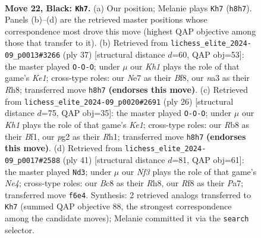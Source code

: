 \documentclass[11pt]{article}
\begin{document}
\clearpage

\begin{figure}[p]\centering
\begin{subfigure}{0.46\textwidth}\centering
\resizebox{\linewidth}{!}{%
\newchessgame
\chessboard[
  setfen={1rb2r1k/p3np2/1p2pnpp/2P5/1RP5/N3PB1P/P4PP1/2B1R1K1 b - - 3 22},
  showmover=false,
  pgfstyle=straightmove, color=movearrow, markmove={h8-h7}
]}
\caption{}
\end{subfigure}\hfill
\begin{subfigure}{0.46\textwidth}\centering
\resizebox{\linewidth}{!}{%
\newchessgame
\chessboard[
  setfen={r3kb1r/1p4p1/p1p1np2/4P2p/2N1P2P/1PP2P2/1P1B1P2/R3K2R b KQkq - 0 19},
  showmover=false,
  pgfstyle=straightmove, color=movearrow, markmove={e8-c8}
]}
\caption{}
\end{subfigure}
\\[4pt]
\begin{subfigure}{0.46\textwidth}\centering
\resizebox{\linewidth}{!}{%
\newchessgame
\chessboard[
  setfen={r3kb1r/ppp2ppp/5p2/3b4/7N/1PP1P3/P4PPP/R3KB1R w KQkq - 0 14},
  showmover=false,
  pgfstyle=straightmove, color=movearrow, markmove={e1-c1}
]}
\caption{}
\end{subfigure}\hfill
\begin{subfigure}{0.46\textwidth}\centering
\resizebox{\linewidth}{!}{%
\newchessgame
\chessboard[
  setfen={2kr1b1r/p4p2/4pP2/2pbn1B1/1pp1N2P/6P1/PP2RPB1/3R2K1 b - - 0 21},
  showmover=false,
  pgfstyle=straightmove, color=movearrow, markmove={e5-d3}
]}
\caption{}
\end{subfigure}
\caption{\textbf{Move 22, Black: \texttt{Kh7}.} (a) Our position; Melanie plays \texttt{Kh7} (\texttt{h8h7}). Panels (b)--(d) are the retrieved master positions whose correspondence most drove this move (highest QAP objective among those that transfer to it). (b) Retrieved from \texttt{lichess\_elite\_2024-09\_p0013\#3266} (ply 37) [structural distance $d$=60, QAP obj=53]: the master played \texttt{O-O-O}; under $\mu$ our \emph{Kh1} plays the role of that game's \emph{Ke1}; cross-type roles: our \emph{N}e7 as their \emph{B}f8, our \emph{n}a3 as their \emph{R}h8; transferred move \texttt{h8h7} \textbf{(endorses this move)}. (c) Retrieved from \texttt{lichess\_elite\_2024-09\_p0020\#2691} (ply 26) [structural distance $d$=75, QAP obj=35]: the master played \texttt{O-O-O}; under $\mu$ our \emph{Kh1} plays the role of that game's \emph{Ke1}; cross-type roles: our \emph{R}b8 as their \emph{B}f1, our \emph{p}g2 as their \emph{R}h1; transferred move \texttt{h8h7} \textbf{(endorses this move)}. (d) Retrieved from \texttt{lichess\_elite\_2024-09\_p0017\#2588} (ply 41) [structural distance $d$=81, QAP obj=61]: the master played \texttt{Nd3}; under $\mu$ our \emph{Nf3} plays the role of that game's \emph{Ne4}; cross-type roles: our \emph{B}c8 as their \emph{R}h8, our \emph{R}f8 as their \emph{P}a7; transferred move \texttt{f6e4}. Synthesis: 2 retrieved analogs transferred to \texttt{Kh7} (summed QAP objective 88, the strongest correspondence among the candidate moves); Melanie committed it via the \texttt{search} selector.}
\label{fig:thought-m43}
\end{figure}
\end{document}
